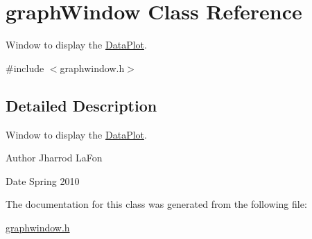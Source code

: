 \hypertarget{classgraphWindow}{
\section{graphWindow Class Reference}
\label{classgraphWindow}
}


Window to display the \hyperlink{classDataPlot}{DataPlot}.  




{\ttfamily \#include $<$graphwindow.h$>$}



\subsection{Detailed Description}
Window to display the \hyperlink{classDataPlot}{DataPlot}. \begin{DoxyAuthor}{Author}
Jharrod LaFon 
\end{DoxyAuthor}
\begin{DoxyDate}{Date}
Spring 2010 
\end{DoxyDate}


The documentation for this class was generated from the following file:\begin{DoxyCompactItemize}
\item 
\hyperlink{graphwindow_8h}{graphwindow.h}\end{DoxyCompactItemize}
